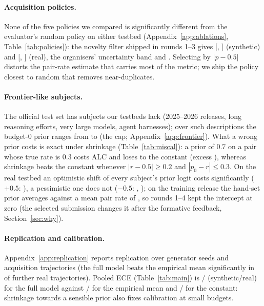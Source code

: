 \documentclass{article}
\begin{document}
\paragraph{Acquisition policies.}
None of the five policies we compared is significantly different from the evaluator's random policy on either testbed (Appendix~\ref{app:ablations}, Table~\ref{tab:policies}): the novelty filter shipped in rounds 1--3 gives \SPolNoveltyVsRandomMean{} [\SPolNoveltyVsRandomLo, \SPolNoveltyVsRandomHi] (synthetic) and \RPolNoveltyVsRandomMean{} [\RPolNoveltyVsRandomLo, \RPolNoveltyVsRandomHi] (real), the organisers' uncertainty band \SPolBleVsRandomMean{} and \RPolBleVsRandomMean. Selecting by $|p-0.5|$ distorts the pair-rate estimate that carries most of the metric; we ship the policy closest to random that removes near-duplicates.

\paragraph{Frontier-like subjects.}
The official test set has subjects our testbeds lack (2025--2026 releases, long reasoning efforts, very large models, agent harnesses); over \SensNGrid{} such descriptions the budget-0 prior ranges from \SensPMin{} to \SensPMax{} (the cap; Appendix~\ref{app:frontier}). What a wrong prior costs is exact under shrinkage (Table~\ref{tab:miscal}): a prior of $0.7$ on a pair whose true rate is $0.3$ costs \MiscalRThreePSeven{} ALC and loses to the constant (excess \MiscalConstRThreeExcess), whereas shrinkage beats the constant whenever $|r-0.5|\ge0.2$ and $|p_0-r|\le0.3$. On the real testbed an optimistic shift of every subject's prior logit costs significantly ($+0.5$: \ROffPlusHalfFullVsZeroMean), a pessimistic one does not ($-0.5$: \ROffMinusHalfFullVsZeroMean, \ROffMinusHalfFullVsZeroSig); on the training release the hand-set prior averages \FitHandPMean{} against a mean pair rate of \FitRateMean, so rounds 1--4 kept the intercept at zero (the selected submission changes it after the formative feedback, Section~\ref{sec:why}).

\paragraph{Replication and calibration.}
Appendix~\ref{app:replication} reports replication over generator seeds and acquisition trajectories (the full model beats the empirical mean significantly in \RSeedsNFullEmpSig{} of \RSeedsN{} further real trajectories). Pooled ECE (Table~\ref{tab:main}) is \SFullEce/\RFullEce{} (synthetic/real) for the full model against \SEmpEce/\REmpEce{} for the empirical mean and \SConstEce/\RConstEce{} for the constant: shrinkage towards a sensible prior also fixes calibration at small budgets.
\end{document}
